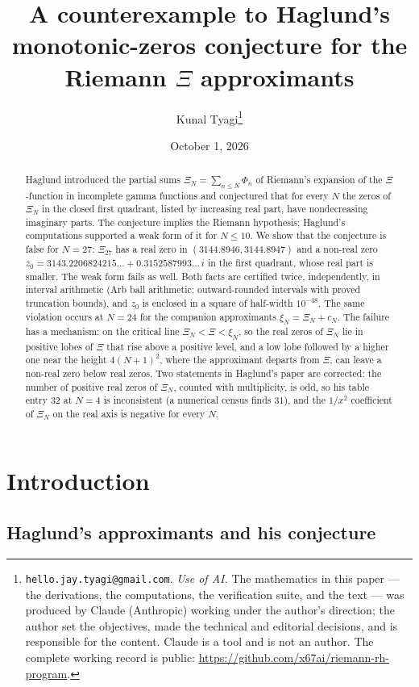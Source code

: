 \documentclass[11pt]{article}
\title{A counterexample to Haglund's monotonic-zeros conjecture for the Riemann
$\Xi$ approximants}
\author{Kunal Tyagi\thanks{%
\texttt{hello.jay.tyagi@gmail.com}. \emph{Use of AI.} The mathematics in this
paper --- the derivations, the computations, the verification suite, and the
text --- was produced by Claude (Anthropic) working under the author's
direction; the author set the objectives, made the technical and editorial
decisions, and is responsible for the content. Claude is a tool and is not an
author. The complete working record is public:
\url{https://github.com/x67ai/riemann-rh-program}.}}
\date{October 1, 2026}
\theoremstyle{plain}
\theoremstyle{definition}
\theoremstyle{remark}
\begin{document}
\maketitle

\begin{abstract}
Haglund introduced the partial sums $\Xi_N = \sum_{n \le N} \Phi_n$ of
Riemann's expansion of the $\Xi$-function in incomplete gamma functions and
conjectured that for every $N$ the zeros of $\Xi_N$ in the closed first
quadrant, listed by increasing real part, have nondecreasing imaginary parts.
The conjecture implies the Riemann hypothesis; Haglund's computations supported a
weak form of it for $N \le 10$. We show that the conjecture is false for
$N = 27$: $\Xi_{27}$ has a real zero in $(3144.8946, 3144.8947)$ and a non-real
zero $z_0 = 3143.2206824215\ldots + 0.3152587993\ldots\, i$ in the first
quadrant, whose real part is smaller. The weak form fails as well. Both facts
are certified twice, independently, in interval arithmetic (Arb ball
arithmetic; outward-rounded intervals with proved truncation bounds), and $z_0$
is enclosed in a square of half-width $10^{-48}$. The same violation occurs at
$N = 24$ for the companion approximants $\xi_N = \Xi_N + c_N$. The failure has a
mechanism: on the critical line $\Xi_N < \Xi < \xi_N$, so the real zeros of
$\Xi_N$ lie in positive lobes of $\Xi$ that rise above a positive level, and a
low lobe followed by a higher one near the height $4(N+1)^2$, where the
approximant departs from $\Xi$, can leave a non-real zero below real zeros. Two
statements in Haglund's paper are corrected: the number of positive real zeros of
$\Xi_N$, counted with multiplicity, is odd, so his table entry $32$ at $N = 4$ is inconsistent (a numerical
census finds $31$), and the $1/x^2$ coefficient of $\Xi_N$ on the real axis is
negative for every $N$.
\end{abstract}

\section{Introduction}
\label{sec:intro}

\subsection{Haglund's approximants and his conjecture}\label{sec:hag}
\end{document}
